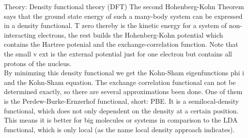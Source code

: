 \begin{frame}{Theory: Density functional theory (DFT)}
{		The second Hohenberg-Kohn Theorem says that the ground state energy of such a many-body system can be expressed in a density functional. T zero thereby is the kinetic energy for a system of non-interacting electrons, the rest builds the Hohenberg-Kohn potential which contains the Hartree potenial and the exchange-correlation function. Note that the small v ext is the external potential just for one electron but contains all protons of the nucleus.\\
		By minimzing this density functional we get the Kohn-Sham eigenfunctions phi i and the Kohn-Sham equation.	The exchange correlation functional can not be determined exactly, so there are several approximations been done. One of them is the Perdew-Burke-Ernzerhof functional, short: PBE. It is a semilocal-density functional,
		which does not only dependent on the density at a certain position. This means it is  better for big molecules or systems in comparison to the LDA functional, which is only local (as the name local density approach indicates). }
\end{frame}

